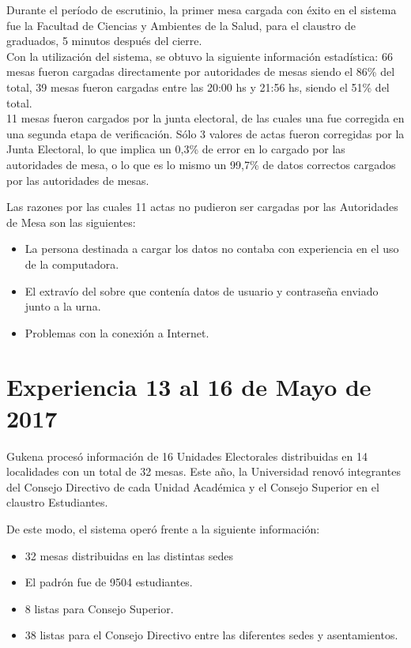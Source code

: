 Durante el período de escrutinio, la primer mesa cargada con éxito en el sistema fue la Facultad de Ciencias y Ambientes de la Salud, para el claustro de graduados, 5 minutos después del cierre.\\ 
Con la utilización del sistema, se obtuvo la siguiente información estadística:
66 mesas fueron cargadas directamente por autoridades de mesas siendo el 86\% del total, 39 mesas fueron cargadas entre las 20:00 hs y 21:56 hs, siendo el 51\% del total.\\
11 mesas fueron cargados por la junta electoral, de las cuales una fue corregida en una segunda etapa de verificación.
Sólo 3 valores de actas fueron corregidas por la Junta Electoral, lo que implica un 0,3\% de error en lo cargado por las autoridades de mesa, o lo que es lo mismo un 99,7\% de datos correctos cargados por las autoridades de mesas.

Las razones por las cuales 11 actas no pudieron ser cargadas por las Autoridades de Mesa son las siguientes:
\begin{itemize}
\item La persona destinada a cargar los datos no contaba con experiencia en el uso de la computadora.
\item El extravío del sobre que contenía datos de usuario y contraseña enviado junto a la urna.
\item Problemas con la conexión a Internet.
\end{itemize}

\section{Experiencia 13 al 16 de Mayo de 2017}
Gukena procesó información de 16 Unidades Electorales distribuidas en 14 localidades con un total de 32 mesas. Este año, la Universidad renovó integrantes del Consejo Directivo de cada Unidad Académica y el Consejo Superior en el claustro Estudiantes.

De este modo, el sistema operó frente a la siguiente información:
\begin{itemize}
    \item 32 mesas distribuidas en las distintas sedes
    \item El padrón fue de 9504 estudiantes.
    \item 8 listas para Consejo Superior.
    \item 38 listas para el Consejo Directivo entre las diferentes sedes y asentamientos.
\end{itemize}
  
